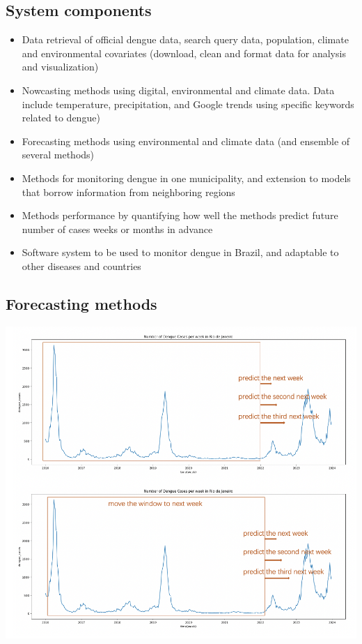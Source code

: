 \documentclass[
  letterpaper,
  DIV=11,
  numbers=noendperiod]{scrreprt}
\providecommand{\tightlist}{%
  \setlength{\itemsep}{0pt}\setlength{\parskip}{0pt}}\usepackage{longtable,booktabs,array}
\begin{document}
\hypertarget{system-components}{%
\subsection*{System components}\label{system-components}}

\begin{itemize}
\tightlist
\item
  Data retrieval of official dengue data, search query data, population,
  climate and environmental covariates (download, clean and format data
  for analysis and visualization)
\item
  Nowcasting methods using digital, environmental and climate data. Data
  include temperature, precipitation, and Google trends using specific
  keywords related to dengue)
\item
  Forecasting methods using environmental and climate data (and ensemble
  of several methods)
\item
  Methods for monitoring dengue in one municipality, and extension to
  models that borrow information from neighboring regions
\item
  Methods performance by quantifying how well the methods predict future
  number of cases weeks or months in advance
\item
  Software system to be used to monitor dengue in Brazil, and adaptable
  to other diseases and countries
\end{itemize}

\hypertarget{forecasting-methods}{%
\subsection*{Forecasting methods}\label{forecasting-methods}}

\includegraphics[width=6.25in,height=\textheight]{img/denguebrazil-forecasts-movewindow.png}
\end{document}
